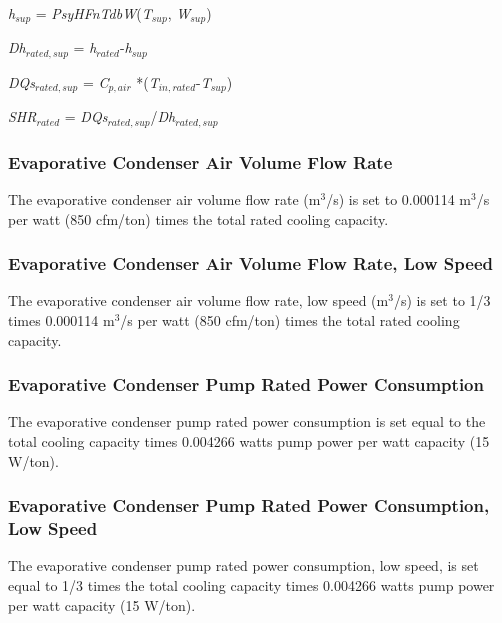 \emph{h\(_{sup}\)} = \emph{PsyHFnTdbW}(\emph{T\(_{sup}\)}, \emph{W\(_{sup}\)})

\emph{Dh}\(_{rated,sup}\) = \emph{h\(_{rated}\)}-\emph{h\(_{sup}\)}

\emph{DQs\(_{rated,sup}\)} = \emph{C\(_{p,air}\)} *(\emph{T\(_{in,rated}\)}-\emph{T\(_{sup}\)})

\emph{SHR\(_{rated}\)} = \emph{DQs\(_{rated,sup}\)}/\emph{Dh}\(_{rated,sup}\)

\subsubsection{Evaporative Condenser Air Volume Flow Rate}\label{evaporative-condenser-air-volume-flow-rate}

The evaporative condenser air volume flow rate (m\(^{3}\)/s) is set to 0.000114 m\(^{3}\)/s per watt (850 cfm/ton) times the total rated cooling capacity.

\subsubsection{Evaporative Condenser Air Volume Flow Rate, Low Speed}\label{evaporative-condenser-air-volume-flow-rate-low-speed}

The evaporative condenser air volume flow rate, low speed (m\(^{3}\)/s) is set to 1/3 times 0.000114 m\(^{3}\)/s per watt (850 cfm/ton) times the total rated cooling capacity.

\subsubsection{Evaporative Condenser Pump Rated Power Consumption}\label{evaporative-condenser-pump-rated-power-consumption}

The evaporative condenser pump rated power consumption is set equal to the total cooling capacity times 0.004266 watts pump power per watt capacity (15 W/ton).

\subsubsection{Evaporative Condenser Pump Rated Power Consumption, Low Speed}\label{evaporative-condenser-pump-rated-power-consumption-low-speed}

The evaporative condenser pump rated power consumption, low speed, is set equal to 1/3 times the total cooling capacity times 0.004266 watts pump power per watt capacity (15 W/ton).

